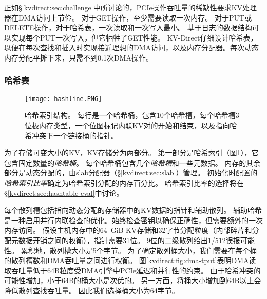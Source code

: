 正如\S \ref {kvdirect:sec:challenge}中所讨论的，PCIe操作吞吐量的稀缺性要求KV处理器在DMA访问上节俭。
对于GET操作，至少需要读取一次内存。
对于PUT或DELETE操作，对于哈希表，一次读取和一次写入最小。
基于日志的数据结构可以实现每个PUT一次写入，但它牺牲了GET性能。
KV-Direct仔细设计哈希表，以便在每次查找和插入时实现接近理想的DMA访问，以及内存分配器。每次动态内存分配平摊下来，只需不到0.1次DMA操作。

\subsubsection{哈希表}
\label{kvdirect:sec:hashtable}

\begin{figure}[t]
\centering
\texttt{[image: hashline.PNG]}
\caption{哈希索引结构。 每行是一个哈希桶，包含10个哈希槽，每个哈希槽3位板内存类型，一个位图标记内联KV对的开始和结束，以及指向哈希冲突下一个链接桶的指针。}
\label{kvdirect:fig:hashtable}

\end{figure}

为了存储可变大小的KV，KV存储分为两部分。 第一部分是哈希索引（图\ref {kvdirect:fig:hashtable}），它包含固定数量的\textit {哈希桶}。 每个哈希桶包含几个\textit {哈希槽}和一些元数据。 内存的其余部分是动态分配的，由slab分配器（\S \ref {kvdirect:sec:slab}）管理。
初始化时配置的\textit {哈希索引比率}确定为哈希索引分配的内存百分比。
哈希索引比率的选择将在\S \ref {kvdirect:sec:hashtable-eval}中讨论。


每个散列槽包括指向动态分配的存储器中的KV数据的指针和辅助散列。
辅助哈希是一种启用并行内联检查的优化。始终检查密钥以确保正确性，但需要额外的一次内存访问。
假设主机内存中的64~GiB KV存储和32字节分配粒度（内部碎片和分配元数据开销之间的权衡），指针需要31位。
9位的二级散列给出1/512误报可能性。
累积地，散列槽大小是5个字节。
为了确定散列桶大小，我们需要在每个桶的散列槽数和DMA吞吐量之间进行权衡。
图\ref {kvdirect:fig:dma-tput}表明DMA读取吞吐量低于64B粒度受DMA引擎中PCIe延迟和并行性的约束。
由于哈希冲突的可能性增加，小于64B的桶大小是次优的。
另一方面，将桶大小增加到64B以上会降低散列查找吞吐量。
因此我们选择桶大小为64字节。

